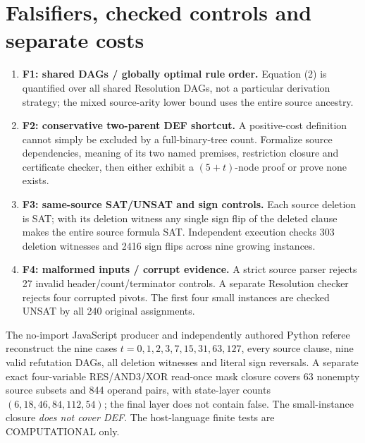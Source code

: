 \documentclass[11pt]{article}
\begin{document}
\section*{Falsifiers, checked controls and separate costs}
\begin{enumerate}
\item[] \textbf{F1: shared DAGs / globally optimal rule order.} Equation (2) is quantified over all shared Resolution DAGs, not a particular derivation strategy; the mixed source-arity lower bound uses the entire source ancestry.
\item[] \textbf{F2: conservative two-parent DEF shortcut.} A positive-cost definition cannot simply be excluded by a full-binary-tree count. Formalize source dependencies, meaning of its two named premises, restriction closure and certificate checker, then either exhibit a $(5+t)$-node proof or prove none exists.
\item[] \textbf{F3: same-source SAT/UNSAT and sign controls.} Each source deletion is SAT; with its deletion witness any single sign flip of the deleted clause makes the entire source formula SAT. Independent execution checks 303 deletion witnesses and 2416 sign flips across nine growing instances.
\item[] \textbf{F4: malformed inputs / corrupt evidence.} A strict source parser rejects 27 invalid header/count/terminator controls. A separate Resolution checker rejects four corrupted pivots. The first four small instances are checked UNSAT by all 240 original assignments.
\end{enumerate}
The no-import JavaScript producer and independently authored Python referee reconstruct the nine cases $t=0,1,2,3,7,15,31,63,127$, every source clause, nine valid refutation DAGs, all deletion witnesses and literal sign reversals. A separate exact four-variable RES/AND3/XOR read-once mask closure covers 63 nonempty source subsets and 844 operand pairs, with state-layer counts $(6,18,46,84,112,54)$; the final layer does not contain false. The small-instance closure \emph{does not cover DEF}. The host-language finite tests are COMPUTATIONAL only.
\end{document}
